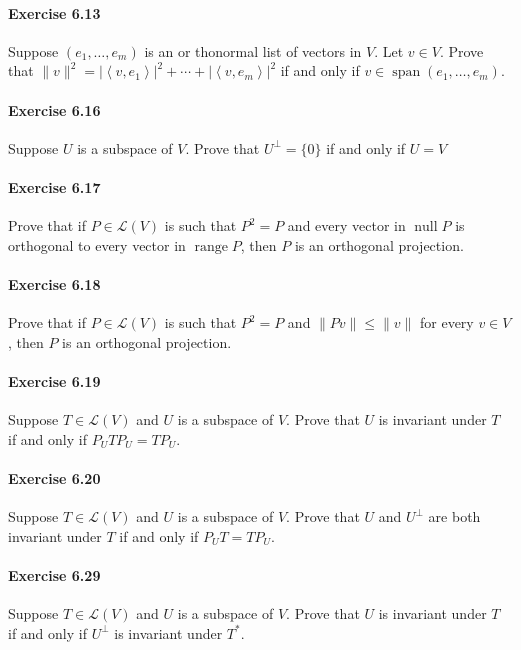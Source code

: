 \documentclass{article}
\theoremstyle{definition}
\begin{document}
\paragraph{Exercise 6.13} Suppose $\left(e_{1}, \ldots, e_{m}\right)$ is an or thonormal list of vectors in $V$. Let $v \in V$. Prove that $\|v\|^{2}=\left|\left\langle v, e_{1}\right\rangle\right|^{2}+\cdots+\left|\left\langle v, e_{m}\right\rangle\right|^{2}$ if and only if $v \in \operatorname{span}\left(e_{1}, \ldots, e_{m}\right)$.

\paragraph{Exercise 6.16} Suppose $U$ is a subspace of $V$. Prove that $U^{\perp}=\{0\}$ if and only if $U=V$

\paragraph{Exercise 6.17} Prove that if $P \in \mathcal{L}(V)$ is such that $P^{2}=P$ and every vector in $\operatorname{null} P$ is orthogonal to every vector in $\operatorname{range} P$, then $P$ is an orthogonal projection.

\paragraph{Exercise 6.18} Prove that if $P \in \mathcal{L}(V)$ is such that $P^{2}=P$ and $\|P v\| \leq\|v\|$ for every $v \in V$, then $P$ is an orthogonal projection.

\paragraph{Exercise 6.19} Suppose $T \in \mathcal{L}(V)$ and $U$ is a subspace of $V$. Prove that $U$ is invariant under $T$ if and only if $P_{U} T P_{U}=T P_{U}$.

\paragraph{Exercise 6.20} Suppose $T \in \mathcal{L}(V)$ and $U$ is a subspace of $V$. Prove that $U$ and $U^{\perp}$ are both invariant under $T$ if and only if $P_{U} T=T P_{U}$.

\paragraph{Exercise 6.29} Suppose $T \in \mathcal{L}(V)$ and $U$ is a subspace of $V$. Prove that $U$ is invariant under $T$ if and only if $U^{\perp}$ is invariant under $T^{*}$.
\end{document}
